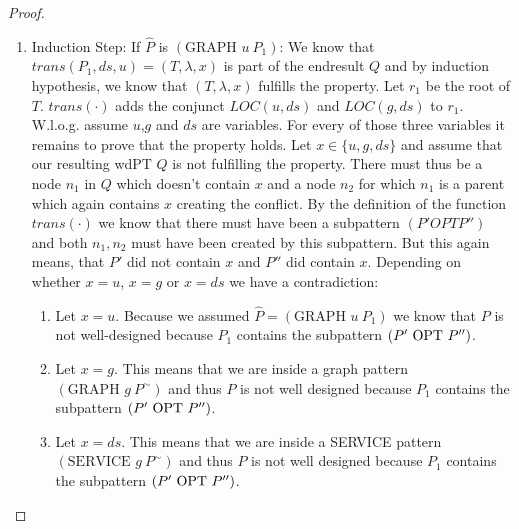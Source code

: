 \begin{proof}
\begin{enumerate}
\begin{enumerate}
				\item Induction Step: If $\hat{P}$ is $(\mbox{GRAPH }  u \ P_1)$:
					We know that $trans(P_1,ds,u) = (T, \lambda,x)$ 
					is part of the endresult $Q$ and by induction hypothesis,
					we know that $(T, \lambda,x)$ fulfills the property. Let
					$r_1$ be the root of $T$. $trans(\cdot)$ adds the conjunct
					$LOC(u,ds)$ and $LOC(g,ds)$ to $r_1$. W.l.o.g. assume $u$,$g$
					and $ds$ are variables. For every of those three variables it
					remains to prove that the property holds.
					Let $x \in \{u,g,ds\}$ and assume that our resulting wdPT $Q$ is
					not fulfilling the property. There must thus be a node $n_1$ in $Q$ which
					doesn't contain $x$ and a node $n_2$ for which $n_1$ is a parent 
					which again contains $x$ creating the conflict.
					By the definition of the function $trans(\cdot)$ we know that
					there must have been a subpattern $(P' OPT P'')$ and both $n_1,n_2$ must
					have been created by this subpattern. But this again means, that
					$P'$ did not contain $x$ and $P''$ did contain $x$. 
					Depending on whether $x = u$, $x=g$ or $x=ds$ we have a
					contradiction:
					\begin{enumerate}
						\item Let $x=u$. Because we assumed $\hat{P}=
							(\mbox{GRAPH } u \ P_1)$ we know that
							$P$ is not well-designed because $P_1$ contains the
							subpattern $(P' \mbox{ OPT } P'')$.
						\item Let $x = g$. This means that we are inside a graph
							pattern $(\mbox{GRAPH } g \ P^\sim)$ and thus $P$ is
							not well designed because $P_1$ contains the
							subpattern $(P' \mbox{ OPT } P'')$.
						\item Let $x = ds$. This means that we are inside a
							SERVICE	pattern\\ $(\mbox{SERVICE } g \ P^\sim)$ and thus $P$ is
							not well designed because $P_1$ contains the
							subpattern $(P' \mbox{ OPT } P'')$.
					\end{enumerate}




\end{enumerate}
\end{enumerate}
\end{proof}
